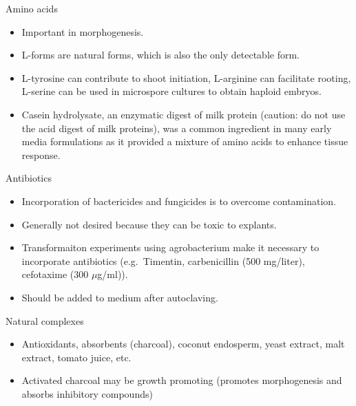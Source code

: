 \documentclass[ignorenonframetext,aspectratio=169]{beamer}
\providecommand{\tightlist}{%
  \setlength{\itemsep}{0pt}\setlength{\parskip}{0pt}}
\begin{document}
\begin{frame}{Amino acids}
\protect\hypertarget{amino-acids}{}

\begin{itemize}
\tightlist
\item
  Important in morphogenesis.
\item
  L-forms are natural forms, which is also the only detectable form.
\item
  L-tyrosine can contribute to shoot initiation, L-arginine can
  facilitate rooting, L-serine can be used in microspore cultures to
  obtain haploid embryos.
\item
  Casein hydrolysate, an enzymatic digest of milk protein (caution: do
  not use the acid digest of milk proteins), was a common ingredient in
  many early media formulations as it provided a mixture of amino acids
  to enhance tissue response.
\end{itemize}

\end{frame}

\begin{frame}{Antibiotics}
\protect\hypertarget{antibiotics}{}

\begin{itemize}
\tightlist
\item
  Incorporation of bactericides and fungicides is to overcome
  contamination.
\item
  Generally not desired because they can be toxic to explants.
\item
  Transformaiton experiments using agrobacterium make it necessary to
  incorporate antibiotics (e.g.~Timentin, carbenicillin (500 mg/liter),
  cefotaxime (300 \(\mu\)g/ml)).
\item
  Should be added to medium after autoclaving.
\end{itemize}

\end{frame}

\begin{frame}{Natural complexes}
\protect\hypertarget{natural-complexes}{}

\begin{itemize}
\tightlist
\item
  Antioxidants, absorbents (charcoal), coconut endosperm, yeast extract,
  malt extract, tomato juice, etc.
\item
  Activated charcoal may be growth promoting (promotes morphogenesis and
  absorbs inhibitory compounds)
\end{itemize}

\end{frame}
\end{document}
